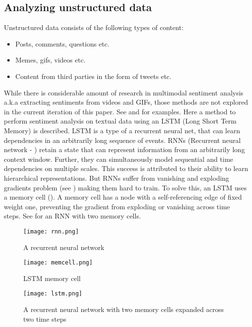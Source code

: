 \documentclass[a4paper]{article}
\begin{document}
\subsection{Analyzing unstructured data}
Unstructured data consists of the following types of content:
\begin{itemize}
	\item Posts, comments, questions etc.
	\item Memes, gifs, videos etc.
	\item Content from third parties in the form of tweets etc.
\end{itemize}
While there is considerable amount of research in multimodal sentiment analysis a.k.a extracting sentiments from videos and GIFs, those methods are not explored in the current iteration of this paper. See \cite{Multimodal1} and \cite{Multimodal2} for examples. Here a method to perform sentiment analysis on textual data using an LSTM (Long Short Term Memory) is described. LSTM is a type of a recurrent neural net, that can learn dependencies in an arbitrarily long sequence of events. RNNs (Recurrent neural network -  \cite{RNNReview}) retain a state that can represent information from an arbitrarily long context window. Further, they can simultaneously model sequential and time dependencies on multiple scales. This success is attributed to their ability to learn hierarchical representations. But RNNs suffer from vanishing and exploding gradients problem (see \cite{GradientProblems}) making them hard to train. To solve this, an LSTM uses a memory cell (). A memory cell has a node with a self-referencing edge of fixed weight one, preventing the gradient from exploding or vanishing across time steps. See  for an RNN with two memory cells.
\begin{figure}[h!] \centering
	\texttt{[image: rnn.png]}
	\caption{A recurrent neural network} \label{fig:rnn}
\end{figure}
\begin{figure}[h!] \centering
	\texttt{[image: memcell.png]}
	\caption{LSTM memory cell} \label{fig:memcell}
\end{figure}
\begin{figure}[h!] \centering
	\texttt{[image: lstm.png]}
	\caption{ A recurrent neural network with two memory cells expanded across two time steps} \label{fig:lstm}
\end{figure}
\end{document}
